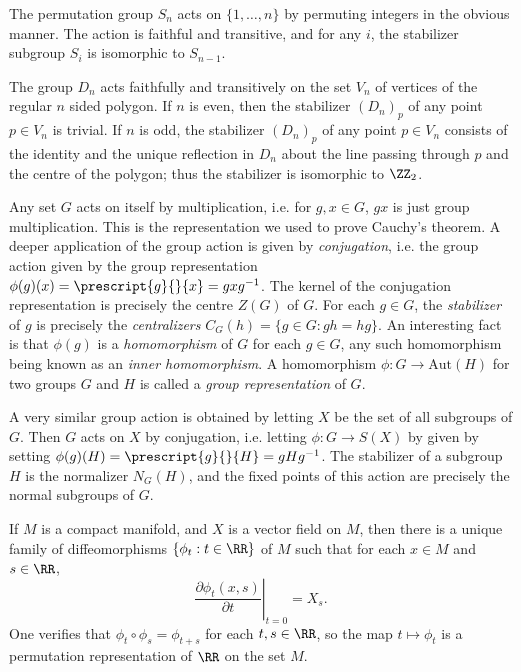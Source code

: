 \begin{example}
    The permutation group $S_n$ acts on $\{ 1, \dots, n \}$ by permuting integers in the obvious manner. The action is faithful and transitive, and for any $i$, the stabilizer subgroup $S_i$ is isomorphic to $S_{n-1}$.
\end{example}

\begin{example}
    The group $D_n$ acts faithfully and transitively on the set $V_n$ of vertices of the regular $n$ sided polygon. If $n$ is even, then the stabilizer $(D_n)_p$ of any point $p \in V_n$ is trivial. If $n$ is odd, the stabilizer $(D_n)_p$ of any point $p \in V_n$ consists of the identity and the unique reflection in $D_n$ about the line passing through $p$ and the centre of the polygon; thus the stabilizer is isomorphic to $\ZZ_2$.
\end{example}

\begin{example}
    Any set $G$ acts on itself by multiplication, i.e. for $g,x \in G$, $gx$ is just group multiplication. This is the representation we used to prove Cauchy's theorem. A deeper application of the group action is given by \emph{conjugation}, i.e. the group action given by the group representation $\phi(g)(x) = \prescript{g}{}{x} = gxg^{-1}$. The kernel of the conjugation representation is precisely the centre $Z(G)$ of $G$. For each $g \in G$, the \emph{stabilizer} of $g$ is precisely the \emph{centralizers} $C_G(h) = \{ g \in G: gh = hg \}$. An interesting fact is that $\phi(g)$ is a \emph{homomorphism} of $G$ for each $g \in G$, any such homomorphism being known as an \emph{inner homomorphism}. A homomorphism $\phi: G \to \text{Aut}(H)$ for two groups $G$ and $H$ is called a \emph{group representation} of $G$.
\end{example}

\begin{example}
    A very similar group action is obtained by letting $X$ be the set of all subgroups of $G$. Then $G$ acts on $X$ by conjugation, i.e. letting $\phi: G \to S(X)$ by given by setting $\phi(g)(H) = \prescript{g}{}{H} = gHg^{-1}$. The stabilizer of a subgroup $H$ is the normalizer $N_G(H)$, and the fixed points of this action are precisely the normal subgroups of $G$.
\end{example}

\begin{example}
    If $M$ is a compact manifold, and $X$ is a vector field on $M$, then there is a unique family of diffeomorphisms $\{ \phi_t: t \in \RR \}$ of $M$ such that for each $x \in M$ and $s \in \RR$,
    \[ \left. \frac{\partial \phi_t(x,s)}{\partial t} \right|_{t = 0} = X_s. \]
    One verifies that $\phi_t \circ \phi_s = \phi_{t + s}$ for each $t,s \in \RR$, so the map $t \mapsto \phi_t$ is a permutation representation of $\RR$ on the set $M$.
\end{example}


